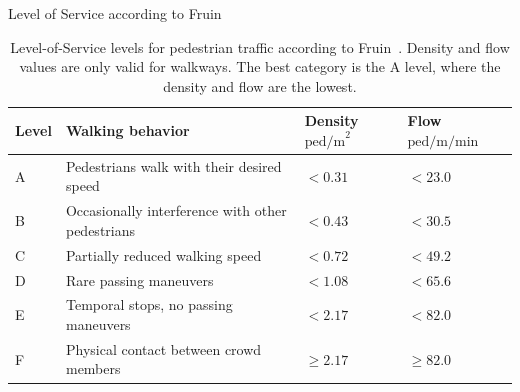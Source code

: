 \begin{table}[hbt!]
\centering
Level of Service according to Fruin~\cite{fruin-1971-cdyn}
\begin{tabular}{p{1.0cm}p{8.5cm}p{1.5cm}p{1.5cm}}
\hline 
Level  & Walking behavior &Density $\text{ped/m}^2$ & Flow $\text{ped/m/min}$  \\ 
\hline
A & Pedestrians walk with their desired speed &  $<0.31$ & $<23.0$  \\ 
B & Occasionally interference with other pedestrians & $<0.43$ & $<30.5$ \\ 
C & Partially reduced walking speed & $<0.72$ & $<49.2$   \\ 
D & Rare passing maneuvers & $<1.08$ & $<65.6$  \\ 
E &Temporal stops, no passing maneuvers     & $<2.17$ & $<82.0$  \\ 
F &Physical contact between crowd members  &  $\geq 2.17$ & $ \geq 82.0$   \\ 
\hline 
\end{tabular} 
\caption[Level-of-Service concept for pedestrian traffic]{Level-of-Service levels for pedestrian traffic according to Fruin~\cite{fruin-1971-cdyn}. Density and flow values are only valid for walkways. The best category is the A level, where the density and flow are the lowest.}
\label{tab:levelofservice}
\end{table}



